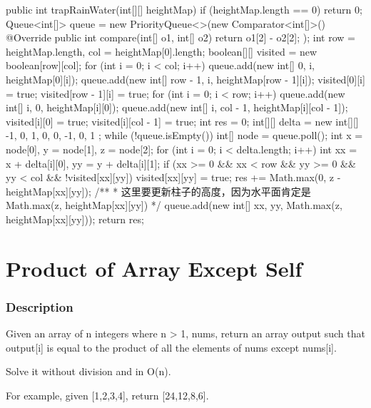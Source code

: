 \begin{Code}
public int trapRainWater(int[][] heightMap) {
    if (heightMap.length == 0) {
        return 0;
    }
    Queue<int[]> queue = new PriorityQueue<>(new Comparator<int[]>() {
        @Override
        public int compare(int[] o1, int[] o2) {
            return o1[2] - o2[2];
        }
    });
    int row = heightMap.length, col = heightMap[0].length;
    boolean[][] visited = new boolean[row][col];
    for (int i = 0; i < col; i++) {
        queue.add(new int[] {0, i, heightMap[0][i]});
        queue.add(new int[] {row - 1, i, heightMap[row - 1][i]});
        visited[0][i] = true;
        visited[row - 1][i] = true;
    }
    for (int i = 0; i < row; i++) {
        queue.add(new int[] {i, 0, heightMap[i][0]});
        queue.add(new int[] {i, col - 1, heightMap[i][col - 1]});
        visited[i][0] = true;
        visited[i][col - 1] = true;
    }
    int res = 0;
    int[][] delta = new int[][] {
            {-1, 0}, {1, 0}, {0, -1}, {0, 1}
    };
    while (!queue.isEmpty()) {
        int[] node = queue.poll();
        int x = node[0], y = node[1], z = node[2];
        for (int i = 0; i < delta.length; i++) {
            int xx = x + delta[i][0], yy = y + delta[i][1];
            if (xx >= 0 && xx < row && yy >= 0 && yy < col && !visited[xx][yy]) {
                visited[xx][yy] = true;
                res += Math.max(0, z - heightMap[xx][yy]);
                /**
                 * 这里要更新柱子的高度，因为水平面肯定是Math.max(z, heightMap[xx][yy])
                 */
                queue.add(new int[] {xx, yy, Math.max(z, heightMap[xx][yy])});
            }
        }
    }
    return res;
}
\end{Code}

\newpage

\section{Product of Array Except Self} %

\subsubsection{Description}
Given an array of n integers where n > 1, nums, return an array output such that output[i] is equal to the product of all the elements of nums except nums[i].

Solve it without division and in O(n).

For example, given [1,2,3,4], return [24,12,8,6].

